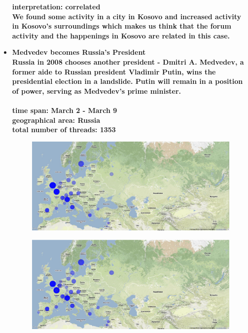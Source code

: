 \documentclass[11pt,a4paper,english]{article}
\begin{document}
\begin{itemize}
\begin{figure}[H]
\begin{center}
							\end{center}
							\vspace{-5pt}
						\end{figure}	
						\bf interpretation: \rm correlated
						\\ We found some activity in a city in Kosovo and increased activity in Kosovo's surroundings which makes us think that the forum activity and the happenings in Kosovo are related in this case.
						
						
						
					\item \bf Medvedev becomes Russia's President \rm
						\\ Russia in 2008 chooses another president - Dmitri A. Medvedev, a former aide to Russian president Vladimir Putin, wins the presidential election in a landslide. Putin will remain in a position of power, serving as Medvedev's prime minister.
						\\\\ \bf time span: \rm March 2 - March 9
						\\ \bf geographical area: \rm Russia
						\\ \bf total number of threads: \rm 1353
						\begin{figure}[H]
							\vspace{-5pt}
  							\begin{center}
								\includegraphics[width=130mm]{img/pre-medvev}		
							\end{center}
							\vspace{-13pt}
						\end{figure}
						\begin{figure}[H]
							\vspace{-13pt}
	  						\begin{center}
								\includegraphics[width=130mm]{img/post-medvev}

\end{center}
\end{figure}
\end{itemize}
\end{document}
